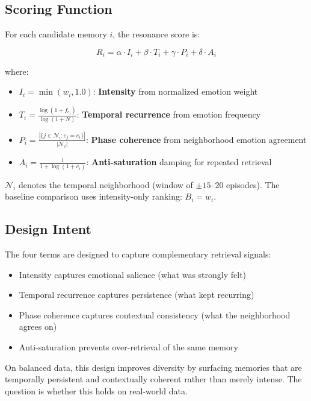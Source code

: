 \documentclass[11pt,a4paper]{article}
\begin{document}
\subsection{Scoring Function}

For each candidate memory $i$, the resonance score is:

\begin{equation}
  R_i = \alpha \cdot I_i + \beta \cdot T_i + \gamma \cdot P_i + \delta \cdot A_i
  \label{eq:resonance}
\end{equation}

where:
\begin{itemize}[itemsep=2pt]
  \item $I_i = \min(w_i, 1.0)$: \textbf{Intensity} from normalized emotion weight
  \item $T_i = \frac{\log(1 + f_{e_i})}{\log(1 + N)}$: \textbf{Temporal recurrence} from emotion frequency
  \item $P_i = \frac{|\{j \in \mathcal{N}_i : e_j = e_i\}|}{|\mathcal{N}_i|}$: \textbf{Phase coherence} from neighborhood emotion agreement
  \item $A_i = \frac{1}{1 + \log(1 + c_i)}$: \textbf{Anti-saturation} damping for repeated retrieval
\end{itemize}

$\mathcal{N}_i$ denotes the temporal neighborhood (window of $\pm 15$--20 episodes). The baseline comparison uses intensity-only ranking: $B_i = w_i$.

\subsection{Design Intent}

The four terms are designed to capture complementary retrieval signals:
\begin{itemize}[itemsep=2pt]
  \item Intensity captures emotional salience (what was strongly felt)
  \item Temporal recurrence captures persistence (what kept recurring)
  \item Phase coherence captures contextual consistency (what the neighborhood agrees on)
  \item Anti-saturation prevents over-retrieval of the same memory
\end{itemize}

On balanced data, this design improves diversity by surfacing memories that are temporally persistent and contextually coherent rather than merely intense. The question is whether this holds on real-world data.
\end{document}

